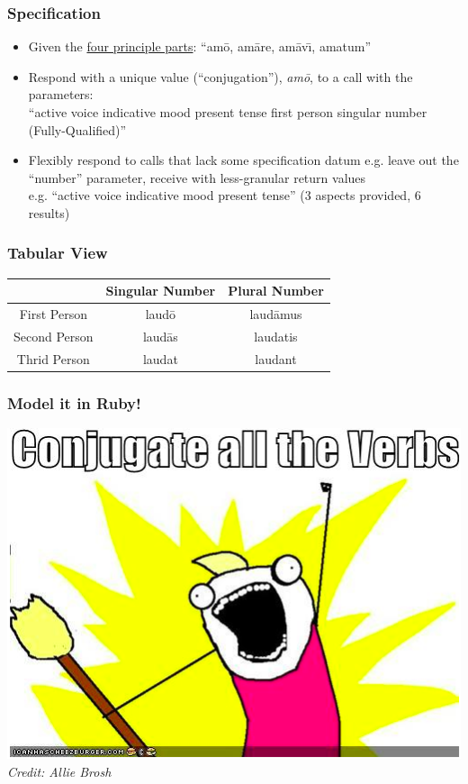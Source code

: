 \documentclass[slidestop,compress,mathserif]{beamer}
\begin{document}
\begin{frame}
	\frametitle{Specification}
	\begin{itemize}
		\item Given the \underline{four principle parts}:  ``am\={o}, am\={a}re, am\={a}v\={\i}, amatum''
		\pause
		\item Respond with a unique value (``conjugation''), \emph{am\={o}}, to a call with the parameters: \\
		``active voice indicative mood present tense first person singular number (Fully-Qualified)''
		\pause
		\item Flexibly respond to calls that lack some specification datum e.g. leave out the ``number'' parameter, receive with less-granular return values\\
          e.g. ``active voice indicative mood present tense'' (3 aspects provided, 6 results)
	\end{itemize}
\end{frame}

\begin{frame}
	\frametitle{Tabular View}
	\begin{center}
		\begin{tabular}{|c|c|c|}
			\hline
			  & Singular Number &  Plural Number\\
			\hline
			First Person  & laud\={o}  & laud\={a}mus\\
			Second Person & laud\={a}s & laudatis \\
			Thrid Person  & laudat     & laudant \\
			\hline
		\end{tabular}
	\end{center}
\end{frame}

\begin{frame}
	\frametitle{Model it in Ruby!}
	\begin{center}
		\includegraphics[scale=0.45]{img/brosh_all.png}
		\vskip 0.5cm
		\emph{Credit:  Allie Brosh}
	\end{center}
\end{frame}
\end{document}
